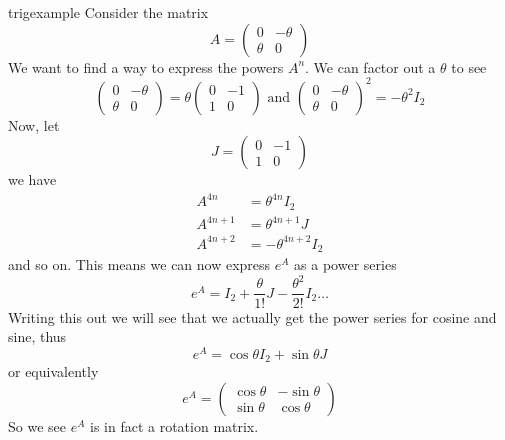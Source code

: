 \begin{boxex}{}{trigexample}
    Consider the matrix 
    \begin{equation*}
        A=
        \begin{pmatrix}
            0 & -\theta\\
            \theta & 0
        \end{pmatrix}
    \end{equation*}
    We want to find a way to express the powers $A^n$. We can factor out a $\theta$
    to see
    \begin{equation*}
        \begin{pmatrix}
            0 & -\theta\\
            \theta & 0
        \end{pmatrix}
        = \theta
        \begin{pmatrix}
            0 & -1\\
            1 & 0
        \end{pmatrix}
        \text{ and }
        \begin{pmatrix}
            0 & -\theta\\
            \theta & 0
        \end{pmatrix}^2
        =-\theta^2 I_2
    \end{equation*}
    Now, let
    \begin{equation*}
        J = 
        \begin{pmatrix}
            0 & -1\\
            1 & 0
        \end{pmatrix}
    \end{equation*}
    we have
    \begin{align*}
        A^{4n} &= \theta^{4n}I_2\\
        A^{4n+1} &= \theta^{4n+1}J\\
        A^{4n+2} &= -\theta^{4n+2}I_2
    \end{align*}
    and so on. This means we can now express $e^A$ as a power series
    \begin{equation*}
        e^A = I_2 + \frac{\theta}{1!}J - \frac{\theta^2}{2!}I_2 \hdots
    \end{equation*}
    Writing this out we will see that we actually get the power series for cosine
    and sine, thus
    \begin{equation*}
        e^A = \cos \theta I_2 + \sin \theta J
    \end{equation*}
    or equivalently
    \begin{equation*}
        e^A = 
        \begin{pmatrix}
            \cos \theta & -\sin \theta\\
            \sin \theta & \cos \theta
        \end{pmatrix}
    \end{equation*}
    So we see $e^A$ is in fact a rotation matrix.
\end{boxex}

